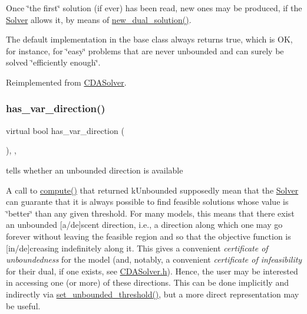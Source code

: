 Once \char`\"{}the first\char`\"{} solution (if ever) has been read, new ones may be produced, if the \mbox{\hyperlink{class_s_m_spp__di__unipi__it_1_1_solver}{Solver}} allows it, by means of \mbox{\hyperlink{class_s_m_spp__di__unipi__it_1_1_m_c_f_solver_aa78ff49c515c8c6e2da6216d104dc219}{new\+\_\+dual\+\_\+solution()}}.

The default implementation in the base class always returns true, which is OK, for instance, for \char`\"{}easy\char`\"{} problems that are never unbounded and can surely be solved \char`\"{}efficiently enough\char`\"{}. 

Reimplemented from \mbox{\hyperlink{class_s_m_spp__di__unipi__it_1_1_c_d_a_solver_a26970b0da7f4f7b56bcfc890983d9a40}{C\+D\+A\+Solver}}.

\mbox{\label{class_s_m_spp__di__unipi__it_1_1_m_c_f_solver_a4f0fecd26f7731710ff6af22fa0cc635}} 
\subsubsection{\texorpdfstring{has\+\_\+var\+\_\+direction()}{has\_var\_direction()}}
{\footnotesize\ttfamily virtual bool has\+\_\+var\+\_\+direction (\begin{DoxyParamCaption}\item[{void}]{ }\end{DoxyParamCaption})\hspace{0.3cm}{\ttfamily [inline]}, {\ttfamily [override]}, {\ttfamily [virtual]}}



tells whether an unbounded direction is available 

A call to \mbox{\hyperlink{class_s_m_spp__di__unipi__it_1_1_m_c_f_solver_afc8ff54ab05d22f4cca0fb0bfbeb7a49}{compute()}} that returned k\+Unbounded supposedly mean that the \mbox{\hyperlink{class_s_m_spp__di__unipi__it_1_1_solver}{Solver}} can guarante that it is always possible to find feasible solutions whose value is \char`\"{}better\char`\"{} than any given threshold. For many models, this means that there exist an unbounded \mbox{[}a/de\mbox{]}scent direction, i.\+e., a direction along which one may go forever without leaving the feasible region and so that the objective function is \mbox{[}in/de\mbox{]}creasing indefinitely along it. This gives a convenient {\itshape certificate of unboundedness} for the model (and, notably, a convenient {\itshape certificate of infeasibility} for their dual, if one exists, see \mbox{\hyperlink{_c_d_a_solver_8h}{C\+D\+A\+Solver.\+h}}). Hence, the user may be interested in accessing one (or more) of these directions. This can be done implicitly and indirectly via \mbox{\hyperlink{class_s_m_spp__di__unipi__it_1_1_solver_ae1717d1363782e086aa797e7437c0352}{set\+\_\+unbounded\+\_\+threshold()}}, but a more direct representation may be useful.

